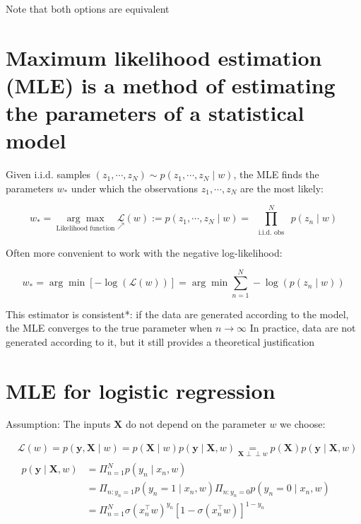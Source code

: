 \documentclass[10pt]{article}
\def\Perp{\perp\!\!\!\perp}
\begin{document}
Note that both options are equivalent

\section*{Maximum likelihood estimation (MLE) is a method of estimating the parameters of a statistical model}
Given i.i.d. samples $\left(z_{1}, \cdots, z_{N}\right) \sim p\left(z_{1}, \cdots, z_{N} \mid w\right)$, the MLE finds the parameters $w_{*}$ under which the observations $z_{1}, \cdots, z_{N}$ are the most likely:

$$
w_{*}=\underset{\text { Likelihood function }}{\arg \max } \underset{\nearrow}{\mathscr{L}}(w):=p\left(z_{1}, \cdots, z_{N} \mid w\right)=\prod_{\substack{\text { i.i.d. obs }}}^{N} p\left(z_{n} \mid w\right)
$$

Often more convenient to work with the negative log-likelihood:

$$
w_{*}=\arg \min [-\log (\mathscr{L}(w))]=\arg \min \sum_{n=1}^{N}-\log \left(p\left(z_{n} \mid w\right)\right)
$$

This estimator is consistent*: if the data are generated according to the model, the MLE converges to the true parameter when $n \rightarrow \infty$ In practice, data are not generated according to it, but it still provides a theoretical justification

\section*{MLE for logistic regression}
Assumption: The inputs $\mathbf{X}$ do not depend on the parameter $w$ we choose:

$$
\begin{aligned}
& \mathscr{L}(w)=p(\mathbf{y}, \mathbf{X} \mid w)=p(\mathbf{X} \mid w) p(\mathbf{y} \mid \mathbf{X}, w) \underset{\mathbf{X} \Perp w}{=} p(\mathbf{X}) p(\mathbf{y} \mid \mathbf{X}, w) \\
& \begin{aligned}
p(\mathbf{y} \mid \mathbf{X}, w) & =\Pi_{n=1}^{N} p\left(y_{n} \mid x_{n}, w\right) \\
& =\Pi_{n: y_{n}=1} p\left(y_{n}=1 \mid x_{n}, w\right) \Pi_{n: y_{n}=0} p\left(y_{n}=0 \mid x_{n}, w\right) \\
& =\Pi_{n=1}^{N} \sigma\left(x_{n}^{\top} w\right)^{y_{n}}\left[1-\sigma\left(x_{n}^{\top} w\right)\right]^{1-y_{n}}
\end{aligned}
\end{aligned}
$$
\end{document}
